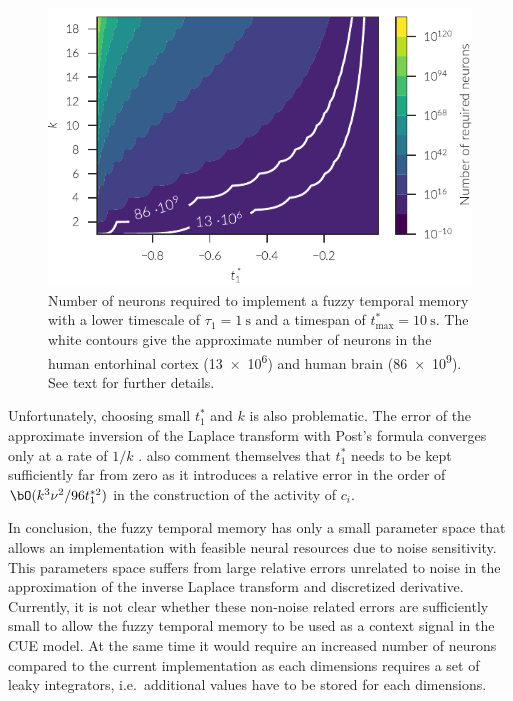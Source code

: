 \begin{figure}
    \centering
    \includegraphics{figures/fuzzy-mem-n-neurons}
    \caption[Number of neurons required to implement a fuzzy temporal memory]{Number of neurons required to implement a fuzzy temporal memory with a lower timescale of $\tau_1 = \SI{1}{\second}$ and a timespan of $t^*_{\max} = \SI{10}{\second}$. The white contours give the approximate number of neurons in the human entorhinal cortex (\num{13e6}) and human brain (\num{86e9}). See text for further details.}\label{fig:fuzzy-mem-n-neurons}
\end{figure}

Unfortunately, choosing small $t^*_1$ and $k$ is also problematic.
The error of the approximate inversion of the Laplace transform with Post's formula converges only at a rate of $1/k$ \parencite{vukimtuan2000}.
\Textcite{shankar2013} also comment themselves that $t^*_1$ needs to be kept sufficiently far from zero as it introduces a relative error in the order of $\bO(k^3\nu^2/96 t^{*2}_1)$ in the construction of the activity of $c_i$.

In conclusion, the fuzzy temporal memory has only a small parameter space that allows an implementation with feasible neural resources due to noise sensitivity.
This parameters space suffers from large relative errors unrelated to noise in the approximation of the inverse Laplace transform and discretized derivative.
Currently, it is not clear whether these non-noise related errors are sufficiently small to allow the fuzzy temporal memory to be used as a context signal in the CUE model.
At the same time it would require an increased number of neurons compared to the current implementation as each dimensions requires a set of leaky integrators, i.e.\ additional values have to be stored for each dimensions.


